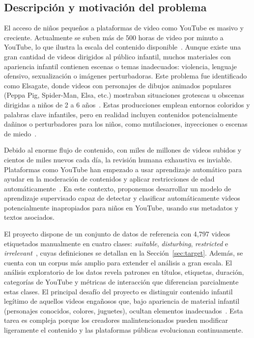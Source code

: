 \documentclass[conference]{IEEEtran}
\begin{document}
\subsection{Descripción y motivación del problema}
El acceso de niños pequeños a plataformas de video como YouTube es masivo y creciente. Actualmente se suben más de 500 horas de video por minuto a YouTube, lo que ilustra la escala del contenido disponible~\cite{brandwatch}. Aunque existe una gran cantidad de videos dirigidos al público infantil, muchos materiales con apariencia infantil contienen escenas o temas inadecuados: violencia, lenguaje ofensivo, sexualización o imágenes perturbadoras. Este problema fue identificado como Elsagate, donde videos con personajes de dibujos animados populares (Peppa Pig, Spider-Man, Elsa, etc.) mostraban situaciones grotescas u obscenas dirigidas a niños de 2 a 6 años~\cite{uscm}. Estas producciones emplean entornos coloridos y palabras clave infantiles, pero en realidad incluyen contenidos potencialmente dañinos o perturbadores para los niños, como mutilaciones, inyecciones o escenas de miedo~\cite{uscm}.

Debido al enorme flujo de contenido, con miles de millones de videos subidos y cientos de miles nuevos cada día, la revisión humana exhaustiva es inviable. Plataformas como YouTube han empezado a usar aprendizaje automático para ayudar en la moderación de contenidos y aplicar restricciones de edad automáticamente~\cite{youtube2020}. En este contexto, proponemos desarrollar un modelo de aprendizaje supervisado capaz de detectar y clasificar automáticamente videos potencialmente inapropiados para niños en YouTube, usando sus metadatos y textos asociados.

El proyecto dispone de un conjunto de datos de referencia con 4,797 videos etiquetados manualmente en cuatro clases: \textit{suitable}, \textit{disturbing}, \textit{restricted} e \textit{irrelevant}~\cite{papadamou}, cuyas definiciones se detallan en la Sección~\ref{sec:target}. Además, se cuenta con un corpus más amplio para extender el análisis a gran escala. El análisis exploratorio de los datos revela patrones en títulos, etiquetas, duración, categorías de YouTube y métricas de interacción que diferencian parcialmente estas clases. El principal desafío del proyecto es distinguir contenido infantil legítimo de aquellos videos engañosos que, bajo apariencia de material infantil (personajes conocidos, colores, juguetes), ocultan elementos inadecuados~\cite{uscm}. Esta tarea es compleja porque los creadores malintencionados pueden modificar ligeramente el contenido y las plataformas públicas evolucionan continuamente.
\end{document}
